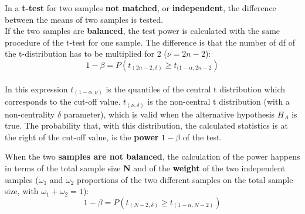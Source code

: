 \begin{frame}
  \vspace*{.25cm}
  In a \textbf{t-test} for two samples \textbf{not matched}, or \textbf{independent}, the difference between the means of two samples is tested.\\
  \vspace*{.25cm}
  If the two samples are \textbf{balanced}, the test power is calculated with the same procedure of the t-test for one sample. The difference is that the number of df of the t-distribution has to be multiplied for 2 ($\nu=2n-2$):
  $$1-\beta=P\left( t_{(2n-2,\delta)}\geq t_{(1-\alpha,2n-2}\right)$$\\
  In this expression $t_{(1-\alpha,\nu)}$ is the quantiles of the central t distribution which corresponds to the cut-off value. $t_{(\nu,\delta)}$ is the non-central t distribution (with a non-centrality $\delta$ parameter), which is valid when the alternative hypothesis $ H_A $ is true. The probability that, with this distribution, the calculated statistics is at the right of the cut-off value, is the \textbf{power} {\boldmath$1-\beta$} of the test.
\end{frame}

\begin{frame}
  \vspace*{.5cm}
  When the two \textbf{samples are not balanced}, the calculation of the power happens in terms of the total sample size \textbf{N} and of the \textbf{weight} of the two independent samples ($\omega_1$ and $\omega_2$ proportions of the two different samples on the total sample size, with $\omega_1+\omega_2=1$):\\
  \vspace*{.5cm}
  $$ 1 - \beta = P \left (t_{(N-2,\delta)} \geq t_{(1-\alpha,N-2)} \right) $$
\end{frame}


